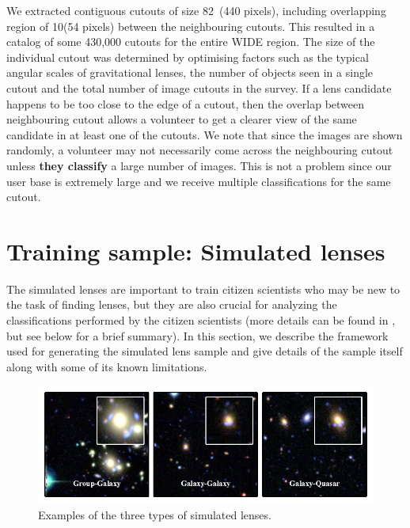 \documentclass[useAMS,usenatbib,a4paper]{mn2e}
\begin{document}
We extracted contiguous cutouts of size 82\arcsec\ (440 pixels), including
overlapping region of 10\arcsec (54 pixels) between the neighbouring
cutouts. This resulted in a catalog of some 430,000 cutouts for the entire \cfhtls
WIDE region. The size of the individual cutout was determined by
optimising factors such as the typical angular scales of gravitational
lenses, the number of objects seen in a single cutout and the total
number of image cutouts in the survey. If a lens
candidate happens to be too close to the edge of a cutout, then the overlap
between neighbouring cutout allows a volunteer to get a clearer view
of the same candidate in at least one of the cutouts. We note that since
the images are shown randomly, a volunteer may not necessarily come
across the neighbouring cutout unless {\bf they classify} a large
number of images. This is not a problem since our user base is extremely
large and we receive multiple classifications for the same cutout.



\section{Training sample: Simulated lenses}
\label{sec:ts}

The simulated lenses are important to train citizen scientists who may be
new to the task of finding lenses, but they are also crucial for
analyzing the classifications performed by the citizen scientists (more
details can be found in \PaperOne, but see  below for a brief
summary). In this section, we describe the framework used for generating the
simulated lens sample and give details of the sample itself along with
some of its known limitations.

\begin{figure}
\begin{center}
\includegraphics[scale=1.0]{sim_cgq.pdf}
\caption{ \label{fig:sim}
Examples of the three types of simulated lenses.
}
\end{center}
\end{figure}
\end{document}
